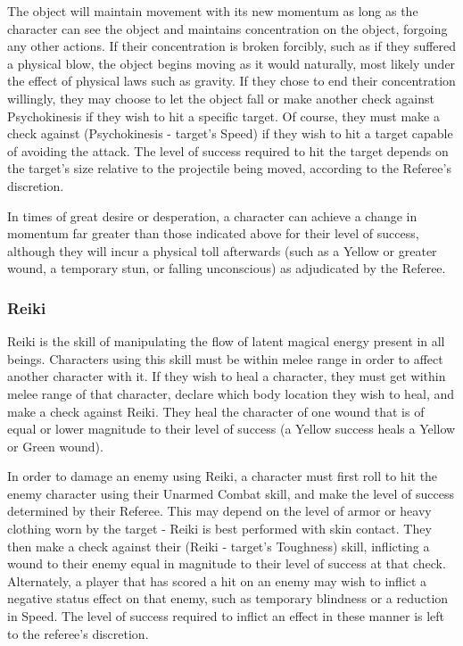 \documentclass[oneside]{book}
\newcommand{\comment}[1]{}
\begin{document}
\begin{multicols}{2}
The object will maintain movement with its new momentum as long as the character can see the object and maintains concentration on the object, forgoing any other actions. If their concentration is broken forcibly, such as if they suffered a physical blow, the object begins moving as it would naturally, most likely under the effect of physical laws such as gravity. If they chose to end their concentration willingly, they may choose to let the object fall or make another check against Psychokinesis if they wish to hit a specific target. Of course, they must make a check against (Psychokinesis - target's Speed) if they wish to hit a target capable of avoiding the attack. The level of success required to hit the target depends on the target's size relative to the projectile being moved, according to the Referee's discretion. 

In times of great desire or desperation, a character can achieve a change in momentum far greater than those indicated above for their level of success, although they will incur a physical toll afterwards (such as a Yellow or greater wound, a temporary stun, or falling unconscious) as adjudicated by the Referee.

\subsubsection{Reiki}
Reiki is the skill of manipulating the flow of latent magical energy present in all beings. Characters using this skill must be within melee range in order to affect another character with it. If they wish to heal a character, they must get within melee range of that character, declare which body location they wish to heal, and make a check against Reiki. They heal the character of one wound that is of equal or lower magnitude to their level of success (a Yellow success heals a Yellow or Green wound). \comment{Alternatively, a Green or higher success can alleviate the negative effects of a Specific Wound for 1+1d4 combat turns.} 

In order to damage an enemy using Reiki, a character must first roll to hit the enemy character using their Unarmed Combat skill, and make the level of success determined by their Referee. This may depend on the level of armor or heavy clothing worn by the target - Reiki is best performed with skin contact. They then make a check against their (Reiki - target's Toughness) skill, inflicting a wound to their enemy equal in magnitude to their level of success at that check. Alternately, a player that has scored a hit on an enemy may wish to inflict a negative status effect on that enemy, such as temporary blindness or a reduction in Speed. The level of success required to inflict an effect in these manner is left to the referee's discretion.


\end{multicols}
\end{document}
